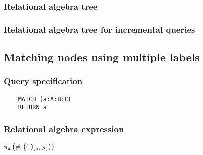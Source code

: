 	\subsubsection*{Relational algebra tree}


	\subsubsection*{Relational algebra tree for incremental queries}

	\subsection{Matching nodes using multiple labels}

	\subsubsection*{Query specification}

	\begin{lstlisting}
	MATCH (a:A:B:C)
	RETURN a
	\end{lstlisting}


	\subsubsection*{Relational algebra expression}

	$\projection{\var{a}} \left(\alldifferent{} \left(\getvertices{a}{A}\right)\right)$

